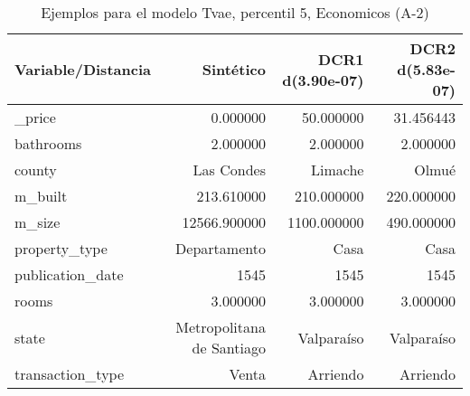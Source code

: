 \begin{table}[H]
\centering
\fontsize{10}{14}\selectfont
\caption{Ejemplos para el modelo Tvae, percentil 5, Economicos (A-2)}
\label{table-example-economicos-a-2-tvae-5p}
\begin{tabular}{|l|r|r|r|}
\hline
\rowcolor[gray]{0.8}
Variable/Distancia & Sintético & DCR1 d(3.90e-07) & DCR2 d(5.83e-07) \\
\hline \_price & \cellcolor[rgb]{0.9, 0.54, 0.52} 0.000000 & 50.000000 & 31.456443 \\
\hline bathrooms & \cellcolor[rgb]{0.9, 0.54, 0.52} 2.000000 & \cellcolor[rgb]{0.9, 0.54, 0.52} 2.000000 & \cellcolor[rgb]{0.9, 0.54, 0.52} 2.000000 \\
\hline county & \cellcolor[rgb]{0.9, 0.54, 0.52} Las Condes & Limache & Olmué \\
\hline m\_built & \cellcolor[rgb]{0.9, 0.54, 0.52} 213.610000 & 210.000000 & 220.000000 \\
\hline m\_size & \cellcolor[rgb]{0.9, 0.54, 0.52} 12566.900000 & 1100.000000 & 490.000000 \\
\hline property\_type & \cellcolor[rgb]{0.9, 0.54, 0.52} Departamento & Casa & Casa \\
\hline publication\_date & \cellcolor[rgb]{0.9, 0.54, 0.52} 1545 & \cellcolor[rgb]{0.9, 0.54, 0.52} 1545 & \cellcolor[rgb]{0.9, 0.54, 0.52} 1545 \\
\hline rooms & \cellcolor[rgb]{0.9, 0.54, 0.52} 3.000000 & \cellcolor[rgb]{0.9, 0.54, 0.52} 3.000000 & \cellcolor[rgb]{0.9, 0.54, 0.52} 3.000000 \\
\hline state & \cellcolor[rgb]{0.9, 0.54, 0.52} Metropolitana de Santiago & Valparaíso & Valparaíso \\
\hline transaction\_type & \cellcolor[rgb]{0.9, 0.54, 0.52} Venta & Arriendo & Arriendo \\
\hline
\end{tabular}
\end{table}

